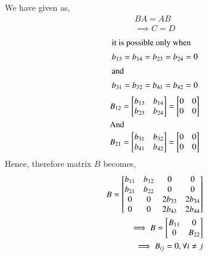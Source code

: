 \documentclass[journal,12pt,twocolumn]{IEEEtran}
\begin{document}
We have given as,
\begin{align}
BA = AB\\
\implies C = D
\end{align}
\begin{align}
\intertext{it is possible only when}
b_{13}= b_{14} = b_{23}= b_{24} = 0 \\
\intertext{and}
 b_{31} = b_{32} = b_{41} = b_{42} = 0
 \end{align}
 \begin{align}
B_{12} =  \begin{bmatrix}
b_{13} & b_{14}\\ 
b_{23}  & b_{24}  
\end{bmatrix} =  \begin{bmatrix}
0 & 0\\ 
0  & 0  
\end{bmatrix}\\ 
\intertext{And}
B_{21} =  \begin{bmatrix}
b_{31} & b_{32}\\
b_{41}  & b_{42}  
\end{bmatrix}  =  \begin{bmatrix}
0 & 0\\ 
0  & 0  
\end{bmatrix} 
\end{align}
Hence, therefore matrix $B$ becomes,
\begin{align}
B =  \begin{bmatrix}
b_{11} & b_{12}  & 0       & 0 \\ 
b_{21} & b_{22}  & 0       & 0  \\
0      & 0       & 2b_{33} & 2b_{34}  \\
0      & 0       & 2b_{43} & 2b_{44}    
\end{bmatrix}\\
\implies B =  \begin{bmatrix}
B_{11} & \huge{0} \\ 
\huge{0}  & B_{22}  
\end{bmatrix}\\
\implies B_{ij} = 0, \forall i \neq j
\end{align}
\end{document}
